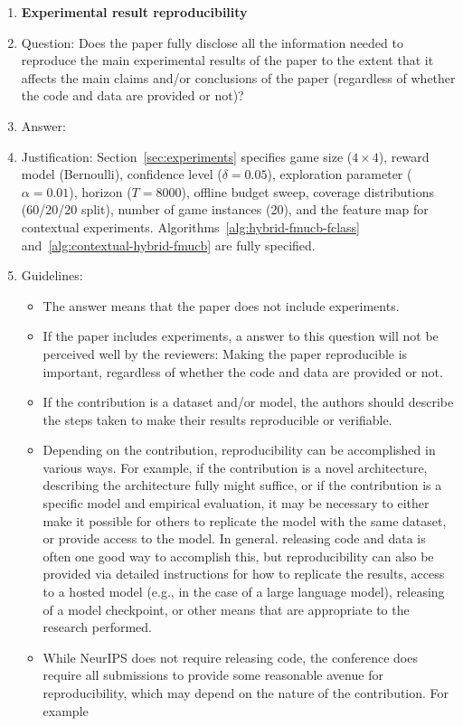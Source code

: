 \documentclass{article}
\begin{document}
\begin{enumerate}
    \item {\bf Experimental result reproducibility}
    \item[] Question: Does the paper fully disclose all the information needed to reproduce the main experimental results of the paper to the extent that it affects the main claims and/or conclusions of the paper (regardless of whether the code and data are provided or not)?
    \item[] Answer: \answerYes{}
    \item[] Justification: Section~\ref{sec:experiments} specifies game size ($4\times 4$), reward model (Bernoulli), confidence level ($\delta=0.05$), exploration parameter ($\alpha=0.01$), horizon ($T=8000$), offline budget sweep, coverage distributions (60/20/20 split), number of game instances (20), and the feature map for contextual experiments. Algorithms~\ref{alg:hybrid-fmucb-fclass} and~\ref{alg:contextual-hybrid-fmucb} are fully specified.
    \item[] Guidelines:
    \begin{itemize}
        \item The answer \answerNA{} means that the paper does not include experiments.
        \item If the paper includes experiments, a \answerNo{} answer to this question will not be perceived well by the reviewers: Making the paper reproducible is important, regardless of whether the code and data are provided or not.
        \item If the contribution is a dataset and\slash or model, the authors should describe the steps taken to make their results reproducible or verifiable.
        \item Depending on the contribution, reproducibility can be accomplished in various ways. For example, if the contribution is a novel architecture, describing the architecture fully might suffice, or if the contribution is a specific model and empirical evaluation, it may be necessary to either make it possible for others to replicate the model with the same dataset, or provide access to the model. In general. releasing code and data is often one good way to accomplish this, but reproducibility can also be provided via detailed instructions for how to replicate the results, access to a hosted model (e.g., in the case of a large language model), releasing of a model checkpoint, or other means that are appropriate to the research performed.
        \item While NeurIPS does not require releasing code, the conference does require all submissions to provide some reasonable avenue for reproducibility, which may depend on the nature of the contribution. For example

\end{itemize}
\end{enumerate}
\end{document}
